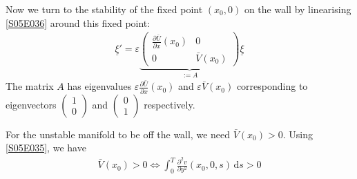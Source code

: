 \begin{solution}[6.2]
Now we turn to the stability of the fixed point $(x_0,0)$ on the wall by linearising \eqref{S05E036} around this fixed point:
\begin{align}
	\underline{\xi}' = \varepsilon \underbrace{\begin{pmatrix}
		\displaystyle \frac{\partial \bar{U}}{\partial x}(x_0) & 0 \\
		0 & \displaystyle \bar{V}(x_0)
	\end{pmatrix}}_{:=A} \underline{\xi}
\end{align}
The matrix $A$ has eigenvalues $\displaystyle \varepsilon \frac{\partial \bar{U}}{\partial x}(x_0)$ and $\varepsilon \bar{V}(x_0)$ corresponding to eigenvectors $\displaystyle \begin{pmatrix} 1 \\ 0 \end{pmatrix}$ and $\displaystyle \begin{pmatrix} 0 \\ 1 \end{pmatrix}$ respectively.

For the unstable manifold to be off the wall, we need $\bar{V}(x_0)>0$. Using \eqref{S05E035}, we have
\begin{align}\label{S05E038}
	\bar{V}(x_0) > 0 \Longleftrightarrow \boxed{\int_0^T \frac{\partial^2 v}{\partial y^2}(x_0,0,s)\,\text{d}s > 0}
\end{align}
\end{solution}

